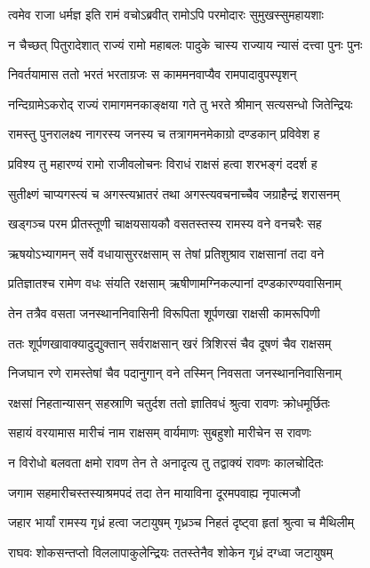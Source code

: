 \twolineshloka
{त्वमेव राजा धर्मज्ञ इति रामं वचोऽब्रवीत्}
{रामोऽपि परमोदारः सुमुखस्सुमहायशाः} %

\twolineshloka
{न चैच्छत् पितुरादेशात् राज्यं रामो महाबलः}
{पादुके चास्य राज्याय न्यासं दत्त्वा पुनः पुनः} %

\twolineshloka
{निवर्तयामास ततो भरतं भरताग्रजः}
{स काममनवाप्यैव रामपादावुपस्पृशन्} %

\twolineshloka
{नन्दिग्रामेऽकरोद् राज्यं रामागमनकाङ्क्षया}
{गते तु भरते श्रीमान् सत्यसन्धो जितेन्द्रियः} %

\twolineshloka
{रामस्तु पुनरालक्ष्य नागरस्य जनस्य च}
{तत्रागमनमेकाग्रो दण्डकान् प्रविवेश ह} %

\twolineshloka
{प्रविश्य तु महारण्यं रामो राजीवलोचनः}
{विराधं राक्षसं हत्वा शरभङ्गं ददर्श ह} %

\twolineshloka
{सुतीक्ष्णं चाप्यगस्त्यं च अगस्त्यभ्रातरं तथा}
{अगस्त्यवचनाच्चैव जग्राहैन्द्रं शरासनम्} %

\twolineshloka
{खड्गञ्च परम प्रीतस्तूणी चाक्षयसायकौ}
{वसतस्तस्य रामस्य वने वनचरैः सह} %

\twolineshloka
{ऋषयोऽभ्यागमन् सर्वे वधायासुररक्षसाम्}
{स तेषां प्रतिशुश्राव राक्षसानां तदा वने} %

\twolineshloka
{प्रतिज्ञातश्च रामेण वधः संयति रक्षसाम्}
{ऋषीणामग्निकल्पानां दण्डकारण्यवासिनाम्} %

\twolineshloka
{तेन तत्रैव वसता जनस्थाननिवासिनी}
{विरूपिता शूर्पणखा राक्षसी कामरूपिणी} %

\twolineshloka
{ततः शूर्पणखावाक्यादुद्युक्तान् सर्वराक्षसान्}
{खरं त्रिशिरसं चैव दूषणं चैव राक्षसम्} %

\twolineshloka
{निजघान रणे रामस्तेषां चैव पदानुगान्}
{वने तस्मिन् निवसता जनस्थाननिवासिनाम्} %

\twolineshloka
{रक्षसां निहतान्यासन् सहस्राणि चतुर्दश}
{ततो ज्ञातिवधं श्रुत्वा रावणः क्रोधमूर्छितः} %

\twolineshloka
{सहायं वरयामास मारीचं नाम राक्षसम्}
{वार्यमाणः सुबहुशो मारीचेन स रावणः} %

\twolineshloka
{न विरोधो बलवता क्षमो रावण तेन ते}
{अनादृत्य तु तद्वाक्यं रावणः कालचोदितः} %

\twolineshloka
{जगाम सहमारीचस्तस्याश्रमपदं तदा}
{तेन मायाविना दूरमपवाह्य नृपात्मजौ} %

\twolineshloka
{जहार भार्यां रामस्य गृध्रं हत्वा जटायुषम्}
{गृध्रञ्च निहतं दृष्ट्वा हृतां श्रुत्वा च मैथिलीम्} %

\twolineshloka
{राघवः शोकसन्तप्तो विललापाकुलेन्द्रियः}
{ततस्तेनैव शोकेन गृध्रं दग्ध्वा जटायुषम्} %

